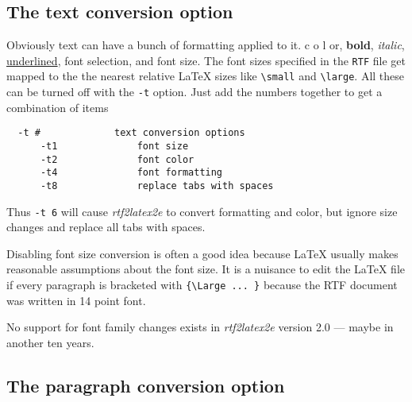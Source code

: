 \documentclass{article}
\def\rtf2latex2e{{\it rtf2latex2e}}
\begin{document}
\subsection{The text conversion option}

Obviously text can have a bunch of formatting applied to it.
{\color{color6} c}{\color{color2} o}{\color{color4} l}{\color{color10}
o}r, {\bf bold}, {\em italic}, {\underline {underlined}}, font selection,
and font size. The font sizes specified in the \texttt{RTF} file get mapped to the 
the nearest relative \LaTeX{} sizes like \verb#\small# and \verb#\large#.
All these can be turned off with the \texttt{-t} option.  Just add the
numbers together to get a combination of items
\begin{verbatim}
  -t #             text conversion options
      -t1              font size
      -t2              font color
      -t4              font formatting
      -t8              replace tabs with spaces
\end{verbatim}
Thus \texttt{-t 6}          
will cause \rtf2latex2e{} to convert formatting and color, but
ignore size changes and replace all tabs with spaces.

Disabling font size conversion is often a good idea because
\LaTeX{} usually makes reasonable assumptions about the font size.
It is a nuisance to edit the \LaTeX{} file if every paragraph is bracketed with 
\verb#{\Large ... }# because the RTF document was written in 
14 point font.

No support for font family changes exists in \rtf2latex2e{} version 2.0
--- maybe in another ten years.

\subsection{The paragraph conversion option}
\end{document}
